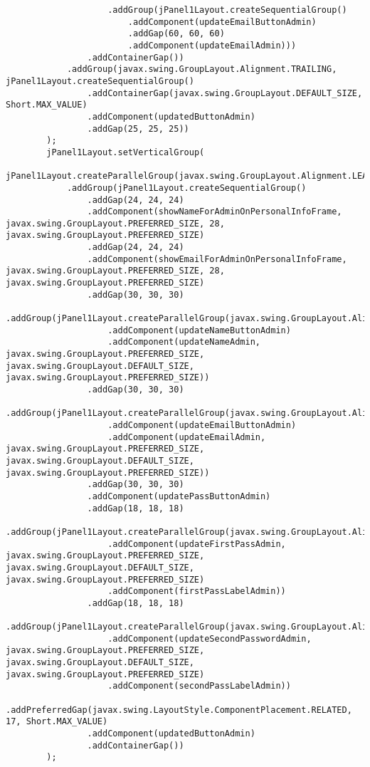 \documentclass[12pt,a4paper]{article}
\begin{document}
\begin{lstlisting}
                    .addGroup(jPanel1Layout.createSequentialGroup()
                        .addComponent(updateEmailButtonAdmin)
                        .addGap(60, 60, 60)
                        .addComponent(updateEmailAdmin)))
                .addContainerGap())
            .addGroup(javax.swing.GroupLayout.Alignment.TRAILING, jPanel1Layout.createSequentialGroup()
                .addContainerGap(javax.swing.GroupLayout.DEFAULT_SIZE, Short.MAX_VALUE)
                .addComponent(updatedButtonAdmin)
                .addGap(25, 25, 25))
        );
        jPanel1Layout.setVerticalGroup(
            jPanel1Layout.createParallelGroup(javax.swing.GroupLayout.Alignment.LEADING)
            .addGroup(jPanel1Layout.createSequentialGroup()
                .addGap(24, 24, 24)
                .addComponent(showNameForAdminOnPersonalInfoFrame, javax.swing.GroupLayout.PREFERRED_SIZE, 28, javax.swing.GroupLayout.PREFERRED_SIZE)
                .addGap(24, 24, 24)
                .addComponent(showEmailForAdminOnPersonalInfoFrame, javax.swing.GroupLayout.PREFERRED_SIZE, 28, javax.swing.GroupLayout.PREFERRED_SIZE)
                .addGap(30, 30, 30)
                .addGroup(jPanel1Layout.createParallelGroup(javax.swing.GroupLayout.Alignment.BASELINE)
                    .addComponent(updateNameButtonAdmin)
                    .addComponent(updateNameAdmin, javax.swing.GroupLayout.PREFERRED_SIZE, javax.swing.GroupLayout.DEFAULT_SIZE, javax.swing.GroupLayout.PREFERRED_SIZE))
                .addGap(30, 30, 30)
                .addGroup(jPanel1Layout.createParallelGroup(javax.swing.GroupLayout.Alignment.LEADING)
                    .addComponent(updateEmailButtonAdmin)
                    .addComponent(updateEmailAdmin, javax.swing.GroupLayout.PREFERRED_SIZE, javax.swing.GroupLayout.DEFAULT_SIZE, javax.swing.GroupLayout.PREFERRED_SIZE))
                .addGap(30, 30, 30)
                .addComponent(updatePassButtonAdmin)
                .addGap(18, 18, 18)
                .addGroup(jPanel1Layout.createParallelGroup(javax.swing.GroupLayout.Alignment.BASELINE)
                    .addComponent(updateFirstPassAdmin, javax.swing.GroupLayout.PREFERRED_SIZE, javax.swing.GroupLayout.DEFAULT_SIZE, javax.swing.GroupLayout.PREFERRED_SIZE)
                    .addComponent(firstPassLabelAdmin))
                .addGap(18, 18, 18)
                .addGroup(jPanel1Layout.createParallelGroup(javax.swing.GroupLayout.Alignment.BASELINE)
                    .addComponent(updateSecondPasswordAdmin, javax.swing.GroupLayout.PREFERRED_SIZE, javax.swing.GroupLayout.DEFAULT_SIZE, javax.swing.GroupLayout.PREFERRED_SIZE)
                    .addComponent(secondPassLabelAdmin))
                .addPreferredGap(javax.swing.LayoutStyle.ComponentPlacement.RELATED, 17, Short.MAX_VALUE)
                .addComponent(updatedButtonAdmin)
                .addContainerGap())
        );


\end{lstlisting}
\end{document}
